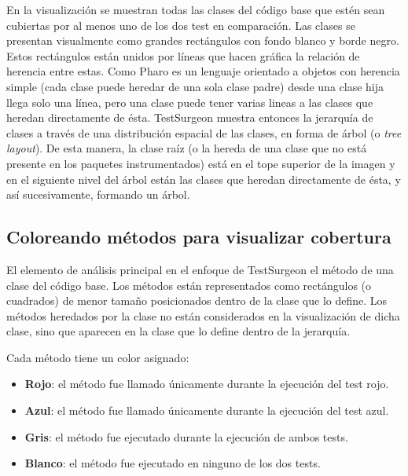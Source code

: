 \par En la visualización se muestran todas las clases del código base que estén sean cubiertas por al menos uno de los dos test en comparación. Las clases se presentan visualmente como grandes rectángulos con fondo blanco y borde negro. Estos rectángulos están unidos por líneas que hacen gráfica la relación de herencia entre estas. Como Pharo es un lenguaje orientado a objetos con herencia simple (cada clase puede heredar de una sola clase padre) desde una clase hija llega solo una línea, pero una clase puede tener varias lineas a las clases que heredan directamente de ésta. TestSurgeon muestra entonces la jerarquía de clases a través de una distribución espacial de las clases, en forma de árbol (o \emph{tree layout}). De esta manera, la clase raíz (o la hereda de una clase que no está presente en los paquetes instrumentados) está en el tope superior de la imagen y en el siguiente nivel del árbol están las clases que heredan directamente de ésta, y así sucesivamente, formando un árbol.


\subsection{Coloreando métodos para visualizar cobertura}

\par El elemento de análisis principal en el enfoque de TestSurgeon el método de una clase del código base. Los métodos están representados como rectángulos (o cuadrados) de menor tamaño posicionados dentro de la clase que lo define.  Los métodos heredados por la clase no están considerados en la visualización de dicha clase, sino que aparecen en la clase que lo define dentro de la jerarquía.  

\par Cada método tiene un color asignado:
\begin{itemize}
\item {\bf Rojo}: el método fue llamado únicamente durante la ejecución del test rojo.
\item {\bf Azul}: el método fue llamado únicamente durante la ejecución del test azul.
\item {\bf Gris}: el método fue ejecutado durante la ejecución de ambos tests.
\item {\bf Blanco}: el método fue ejecutado en ninguno de los dos tests.
\end{itemize}

